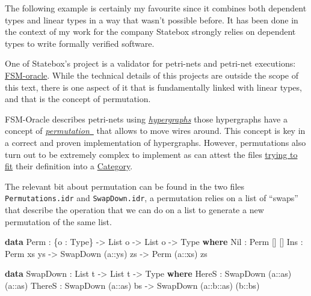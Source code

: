 \documentclass[
]{article}
\newenvironment{Shaded}{}{}
\newcommand{\DataTypeTok}[1]{\textcolor[rgb]{0.56,0.13,0.00}{#1}}
\newcommand{\KeywordTok}[1]{\textcolor[rgb]{0.00,0.44,0.13}{\textbf{#1}}}
\newcommand{\NormalTok}[1]{#1}
\newcommand{\OperatorTok}[1]{\textcolor[rgb]{0.40,0.40,0.40}{#1}}
\newcommand{\OtherTok}[1]{\textcolor[rgb]{0.00,0.44,0.13}{#1}}
\begin{document}
The following example is certainly my favourite since it combines both
dependent types and linear types in a way that wasn't possible before.
It has been done in the context of my work for the company Statebox
strongly relies on dependent types to write formally verified software.

One of Statebox's project is a validator for petri-nets\cite{petri-nets}
and petri-net executions:
\href{https://github.com/statebox/fsm-oracle}{FSM-oracle}. While the
technical details of this projects are outside the scope of this text,
there is one aspect of it that is fundamentally linked with linear
types, and that is the concept of permutation.

FSM-Oracle describes petri-nets using
\href{http://www.zanasi.com/fabio/files/paperCALCO19b.pdf}{\emph{hypergraphs}}
\cite{cartographer} those hypergraphs have a concept of
\href{https://github.com/statebox/fsm-oracle/blob/master/src/Permutations/Permutations.idr\#L31}{\emph{permutation}~}
that allows to move wires around. This concept is key in a correct and
proven implementation of hypergraphs. However, permutations also turn
out to be extremely complex to implement as can attest the files
\href{https://github.com/statebox/fsm-oracle/blob/master/src/Permutations/PermutationsCategory.idr}{trying
to fit} their definition into a
\href{https://github.com/statebox/fsm-oracle/blob/master/src/Permutations/PermutationsStrictMonoidalCategory.idr}{Category}.

The relevant bit about permutation can be found in the two files
\texttt{Permutations.idr} and \texttt{SwapDown.idr}, a permutation
relies on a list of ``swaps'' that describe the operation that we can do
on a list to generate a new permutation of the same list.

\begin{Shaded}
\begin{Highlighting}[]
\KeywordTok{data} \DataTypeTok{Perm} \OperatorTok{:}\NormalTok{ \{o }\OperatorTok{:} \DataTypeTok{Type}\NormalTok{\} }\OtherTok{{-}\textgreater{}} \DataTypeTok{List}\NormalTok{ o }\OtherTok{{-}\textgreater{}} \DataTypeTok{List}\NormalTok{ o }\OtherTok{{-}\textgreater{}} \DataTypeTok{Type} \KeywordTok{where}
  \DataTypeTok{Nil} \OperatorTok{:} \DataTypeTok{Perm}\NormalTok{ [] []}
  \DataTypeTok{Ins} \OperatorTok{:} \DataTypeTok{Perm}\NormalTok{ xs ys }\OtherTok{{-}\textgreater{}} \DataTypeTok{SwapDown}\NormalTok{ (}\OtherTok{a::}\NormalTok{ys) zs }\OtherTok{{-}\textgreater{}} \DataTypeTok{Perm}\NormalTok{ (}\OtherTok{a::}\NormalTok{xs) zs}

\KeywordTok{data} \DataTypeTok{SwapDown} \OperatorTok{:} \DataTypeTok{List}\NormalTok{ t }\OtherTok{{-}\textgreater{}} \DataTypeTok{List}\NormalTok{ t }\OtherTok{{-}\textgreater{}} \DataTypeTok{Type} \KeywordTok{where}
  \DataTypeTok{HereS}  \OperatorTok{:} \DataTypeTok{SwapDown}\NormalTok{ (}\OtherTok{a::}\NormalTok{as) (}\OtherTok{a::}\NormalTok{as)}
  \DataTypeTok{ThereS} \OperatorTok{:} \DataTypeTok{SwapDown}\NormalTok{ (}\OtherTok{a::}\NormalTok{as) bs }\OtherTok{{-}\textgreater{}} \DataTypeTok{SwapDown}\NormalTok{ (}\OtherTok{a::b::}\NormalTok{as) (}\OtherTok{b::}\NormalTok{bs)}
\end{Highlighting}
\end{Shaded}
\end{document}
